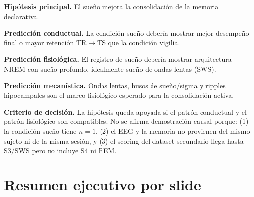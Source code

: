 \documentclass[11pt,a4paper]{article}
\begin{document}
\textbf{Hipótesis principal.} El sueño mejora la consolidación de la memoria declarativa.

\textbf{Predicción conductual.} La condición sueño debería mostrar mejor desempeño final o mayor retención TR$\rightarrow$TS que la condición vigilia.

\textbf{Predicción fisiológica.} El registro de sueño debería mostrar arquitectura NREM con sueño profundo, idealmente sueño de ondas lentas (SWS).

\textbf{Predicción mecanística.} Ondas lentas, husos de sueño/sigma y ripples hipocampales son el marco fisiológico esperado para la consolidación activa.

\textbf{Criterio de decisión.} La hipótesis queda apoyada si el patrón conductual y el patrón fisiológico son compatibles. No se afirma demostración causal porque: (1) la condición sueño tiene $n=1$, (2) el EEG y la memoria no provienen del mismo sujeto ni de la misma sesión, y (3) el scoring del dataset secundario llega hasta S3/SWS pero no incluye S4 ni REM.

\section{Resumen ejecutivo por slide}
\end{document}

